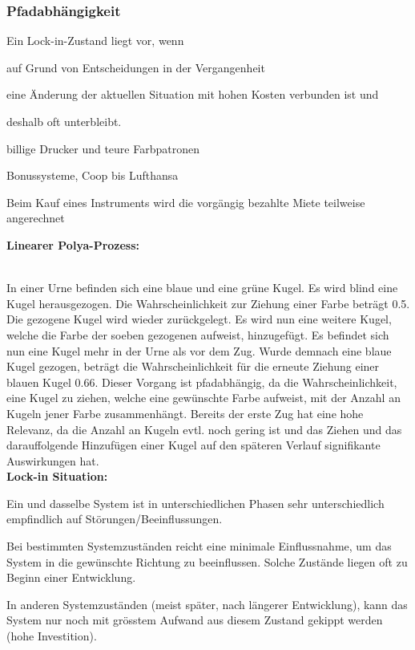 \subsubsection{Pfadabhängigkeit}
Ein Lock-in-Zustand liegt vor, wenn
\begin{compactitem}
	\item auf Grund von Entscheidungen in der Vergangenheit
	\item eine Änderung der aktuellen Situation mit hohen Kosten verbunden ist und
	\item deshalb oft unterbleibt.
\end{compactitem}
\begin{example}
	\begin{compactitem}
		\item billige Drucker und teure Farbpatronen
		\item Bonussysteme, Coop bis Lufthansa
		\item Beim Kauf eines Instruments wird die vorgängig bezahlte Miete teilweise angerechnet
	\end{compactitem}
\end{example}
\textbf{Linearer Polya-Prozess:} \\
 \\
In einer Urne befinden sich eine blaue und eine grüne Kugel. Es wird blind eine Kugel herausgezogen. Die Wahrscheinlichkeit zur Ziehung einer Farbe beträgt 0.5. Die gezogene Kugel wird wieder zurückgelegt. Es wird nun eine weitere Kugel, welche die Farbe der soeben gezogenen aufweist, hinzugefügt. Es befindet sich nun eine Kugel mehr in der Urne als vor dem Zug. Wurde demnach eine blaue Kugel gezogen, beträgt die Wahrscheinlichkeit für die erneute Ziehung einer blauen Kugel 0.66. Dieser Vorgang ist pfadabhängig, da die Wahrscheinlichkeit, eine Kugel zu ziehen, welche eine gewünschte Farbe aufweist, mit der Anzahl an Kugeln jener Farbe zusammenhängt. Bereits der erste Zug hat eine hohe Relevanz, da die Anzahl an Kugeln evtl. noch gering ist und das Ziehen und das darauffolgende Hinzufügen einer Kugel auf den späteren Verlauf signifikante Auswirkungen hat. \\
\textbf{Lock-in Situation:}
\begin{compactitem}
	\item Ein und dasselbe System ist in unterschiedlichen Phasen sehr unterschiedlich empfindlich auf Störungen/Beeinflussungen.
	\item Bei bestimmten Systemzuständen reicht eine minimale Einflussnahme, um das	System in die gewünschte Richtung zu	beeinflussen. Solche Zustände liegen oft zu Beginn einer Entwicklung.
	\item In anderen Systemzuständen (meist später,	nach längerer Entwicklung), kann das System	nur noch mit grösstem Aufwand aus diesem Zustand gekippt werden (hohe Investition).
\end{compactitem}